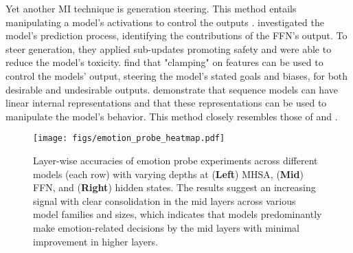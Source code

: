 Yet another MI technique is generation steering. This method entails manipulating a model's activations to control the outputs \cite{rai2024practical, todd2024function}. \citet{geva2022transformer} investigated the model's prediction process, identifying the contributions of the FFN's output. To steer generation, they applied sub-updates promoting safety and were able to reduce the model's toxicity. 
\citet{templeton2024scaling} find that "clamping" on features can be used to control the models' output, steering the model's stated goals and biases, for both desirable and undesirable outputs. 
\citet{nanda2023emergent} demonstrate that sequence models can have linear internal representations and that these representations can be used to manipulate the model's behavior. This method closely resembles those of \citet{turner2308activation} and \citet{lieberum2023does}.




\begin{figure*}[ht!]
  \texttt{[image: figs/emotion\_probe\_heatmap.pdf]}
  \caption {Layer-wise accuracies of emotion probe experiments across different models (each row) with varying depths at (\textbf{Left}) MHSA, (\textbf{Mid}) FFN, and (\textbf{Right}) hidden states. The results suggest an increasing signal with clear consolidation in the mid layers across various model families and sizes, which indicates that models predominantly make emotion-related decisions by the mid layers with minimal improvement in higher layers. %
}
  \label{fig:e_probe_heat}
\end{figure*}
